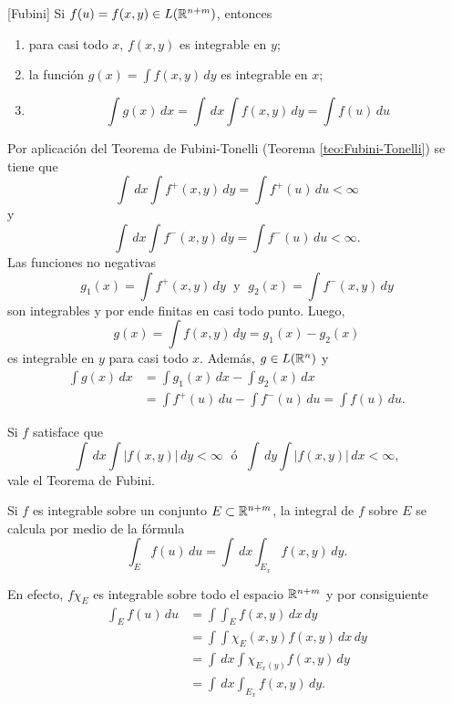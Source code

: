         \begin{teorema}{}[Fubini]
        Si $f(u)=f(x,y) \in L(\mathbb{R}^{n+m})$, entonces
        \begin{enumerate}
            \item para casi todo $x$, $f(x,y)$ es integrable en $y$;
            \item la funci\'on $g(x)=\int f(x,y)\,dy$ es integrable en $x$;
            \item \[
            \int g(x)\,dx=\int \,dx \int f(x,y)\,dy=\int f(u)\,du
            \]
        \end{enumerate}
                \end{teorema}
               
                
                \begin{demo}
                 Por aplicaci\'on del Teorema de Fubini-Tonelli (Teorema \ref{teo:Fubini-Tonelli}) se tiene que 
                 \[
                 \int\,dx \int f^{+}(x,y)\,dy=\int f^{+}(u)\,du<\infty
                 \]
                 y 
                 \[
                  \int\,dx \int f^{-}(x,y)\,dy=\int f^{-}(u)\,du<\infty.
                 \]
                 Las funciones no negativas
\[
g_1(x)=\int f^{+}(x,y)\,dy\; \mbox{ y }\; 
g_2(x)=\int f^{-}(x,y)\,dy
\]
son integrables y por ende finitas en casi todo punto. 
Luego, 
\[g(x)=\int f(x,y)\,dy=g_1(x)-g_2(x)
\]
es integrable en $y$ para casi todo $x$. Adem\'as, $g \in L(\mathbb{R}^n)$ y 
\[
\begin{split}
\int g(x)\,dx&=\int g_1(x)\,dx - \int g_2(x)\,dx
\\&=\int f^{+}(u)\,du - \int f^{-}(u)\,du=\int f(u)\,du.
\end{split}
\]
                \end{demo}
                
                \begin{corolario}{}
Si $f$ satisface que 
\[
\int\,dx \int |f(x,y)|\,dy<\infty\; \mbox{ \'o }\;
\int\,dy \int |f(x,y)|\,dx<\infty,
\]
vale el Teorema de Fubini.
\end{corolario}
        
        
Si $f$ es integrable sobre un conjunto $E\subset \mathbb{R}^{n+m}$, la integral de $f$ sobre $E$ se calcula por medio de la f\'ormula
\[
\int_E f(u)\,du=\int\,dx \int_{E_x} f(x,y)\,dy.
\]

En efecto, $f\chi_E$ es integrable sobre todo el espacio $\mathbb{R}^{n+m}$ y por consiguiente
\[
\begin{split}
\int_E f(u)\,du &=\int\int_E f(x,y)\,dx\,dy
\\
&=\int\int \chi_E(x,y)f(x,y)\,dx\,dy
\\
&=\int\,dx\int \chi_{E_x(y)}f(x,y)\,dy
\\
&=\int\,dx\int_{E_x} f(x,y)\,dy.
\end{split}
\]
